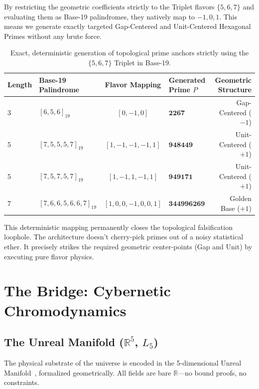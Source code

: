 By restricting the geometric coefficients strictly to the Triplet flavors $\{5, 6, 7\}$ and evaluating them as Base-19 palindromes, they natively map to $-1, 0, 1$. This means we generate exactly targeted Gap-Centered and Unit-Centered Hexagonal Primes without any brute force.

\begin{table}[H]
\centering
\begin{tabular}{@{}llclr@{}}
\toprule
\textbf{Length} & \textbf{Base-19 Palindrome} & \textbf{Flavor Mapping} & \textbf{Generated Prime $P$} & \textbf{Geometric Structure} \\
\midrule
3 & $[6, 5, 6]_{19}$ & $[0, -1, 0]$ & $\mathbf{2267}$ & Gap-Centered ($-1$) \\
5 & $[7, 5, 5, 5, 7]_{19}$ & $[1, -1, -1, -1, 1]$ & $\mathbf{948449}$ & Unit-Centered ($+1$) \\
5 & $[7, 5, 7, 5, 7]_{19}$ & $[1, -1, 1, -1, 1]$ & $\mathbf{949171}$ & Unit-Centered ($+1$) \\
7 & $[7, 6, 6, 5, 6, 6, 7]_{19}$ & $[1, 0, 0, -1, 0, 0, 1]$ & $\mathbf{344996269}$ & Golden Base ($+1$) \\
\bottomrule
\end{tabular}
\caption{Exact, deterministic generation of topological prime anchors strictly using the $\{5, 6, 7\}$ Triplet in Base-19.}
\end{table}

This deterministic mapping permanently closes the topological falsification loophole. The architecture doesn't cherry-pick primes out of a noisy statistical ether. It precisely strikes the required geometric center-points (Gap and Unit) by executing pure flavor physics.


\section{The Bridge: Cybernetic Chromodynamics}

\subsection{The Unreal Manifold ($\mathbb{R}^5$, $L_5$)}

The physical substrate of the universe is encoded in the 5-dimensional Unreal Manifold~\cite{GoldenTetrahedron}, formalized geometrically. All fields are bare $\mathbb{R}$---no bound proofs, no constraints.

